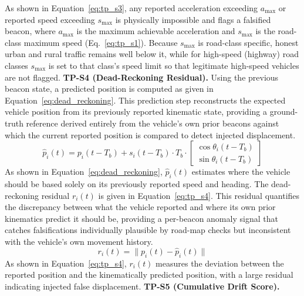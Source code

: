 \documentclass[12pt, a4paper]{report}
\begin{document}
As shown in Equation~\ref{eq:tp_s3}, any reported acceleration exceeding
$a_{\max}$ or reported speed exceeding $s_{\max}$ is physically impossible
and flags a falsified beacon, where $a_{\max}$ is the maximum achievable
acceleration and $s_{\max}$ is the road-class maximum speed
(Eq.~\ref{eq:tp_s1}). Because $s_{\max}$ is road-class specific, honest
urban and rural traffic remains well below it, while for high-speed
(highway) road classes $s_{\max}$ is set to that class's speed limit so
that legitimate high-speed vehicles are not flagged.
\newpage
\textbf{TP-S4 (Dead-Reckoning Residual).}
Using the previous beacon state, a predicted position
is computed as given in Equation~\ref{eq:dead_reckoning}.
\newline
\newline
This prediction step reconstructs the expected vehicle position from
its previously reported kinematic state, providing a ground-truth
reference derived entirely from the vehicle's own prior beacons
against which the current reported position is compared to detect
injected displacement.
\begin{equation}
  \hat{p}_i(t) = p_i(t-T_b) + s_i(t-T_b)\cdot T_b \cdot
  \begin{bmatrix}\cos\theta_i(t-T_b)\\ \sin\theta_i(t-T_b)\end{bmatrix}
  \label{eq:dead_reckoning}
\end{equation}
As shown in Equation~\ref{eq:dead_reckoning}, $\hat{p}_i(t)$ estimates
where the vehicle should be based solely on its previously reported
speed and heading.
\newline
\newline
The dead-reckoning residual $r_i(t)$ is given in
Equation~\ref{eq:tp_s4}. This residual quantifies the discrepancy between what the vehicle
reported and where its own prior kinematics predict it should be,
providing a per-beacon anomaly signal that catches falsifications
individually plausible by road-map checks but inconsistent with the
vehicle's own movement history.
\begin{equation}
  r_i(t) = \bigl\|p_i(t) - \hat{p}_i(t)\bigr\|
  \label{eq:tp_s4}
\end{equation}
As shown in Equation~\ref{eq:tp_s4}, $r_i(t)$ measures the deviation
between the reported position and the kinematically predicted position,
with a large residual indicating injected false displacement.
\newline
\newline
\textbf{TP-S5 (Cumulative Drift Score).}
\end{document}
